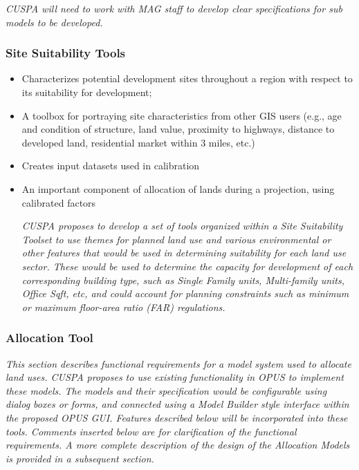 \documentclass[titlepage]{article}
\begin{document}
\emph{CUSPA will need to work with MAG staff to develop clear specifications for sub models to be developed.}


\subsubsection{Site Suitability Tools}
\begin{itemize}
\item Characterizes potential development sites throughout a region with respect to its suitability for development;
\item A toolbox for portraying site characteristics from other GIS users (e.g., age and condition of structure, land value, proximity to highways, distance to developed land, residential market within 3 miles, etc.)
\item Creates input datasets used in calibration
\item An important component of allocation of lands during a projection, using calibrated factors

\emph{CUSPA proposes to develop a set of tools organized within a Site Suitability Toolset to use themes for planned land use and various environmental or other features that would be used in determining suitability for each land use sector.  These would be used to determine the capacity for development of each corresponding building type, such as Single Family units, Multi-family units, Office Sqft, etc, and could account for planning constraints such as minimum or maximum floor-area ratio (FAR) regulations.}

\end{itemize}

\subsubsection{Allocation Tool}

\emph{This section describes functional requirements for a model system used to allocate land uses.  CUSPA proposes to use existing functionality in OPUS to implement these models.  The models and their specification would be configurable using dialog boxes or forms, and connected using a Model Builder style interface within the proposed OPUS GUI.  Features described below will be incorporated into these tools.  Comments inserted below are for clarification of the functional requirements.  A more complete description of the design of the Allocation Models is provided in a subsequent section.}
\end{document}
